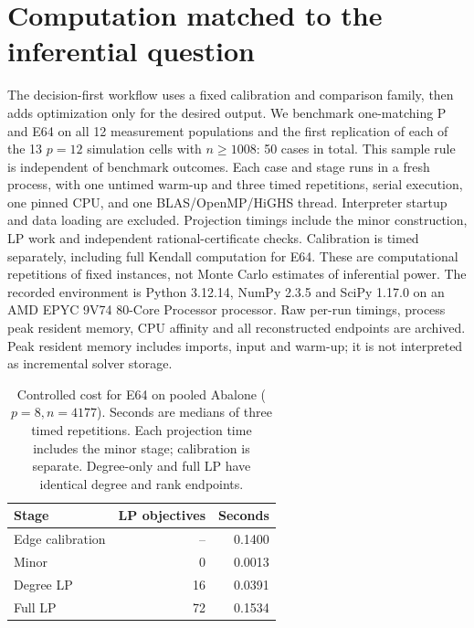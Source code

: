 \section{Computation matched to the inferential question}\label{sec:cost}
The decision-first workflow uses a fixed calibration and comparison family, then adds optimization only for the desired output. We benchmark one-matching P and E64 on all 12 measurement populations and the first replication of each of the 13 $p=12$ simulation cells with $n\ge1008$: 50 cases in total. This sample rule is independent of benchmark outcomes. Each case and stage runs in a fresh process, with one untimed warm-up and three timed repetitions, serial execution, one pinned CPU, and one BLAS/OpenMP/HiGHS thread. Interpreter startup and data loading are excluded. Projection timings include the minor construction, LP work and independent rational-certificate checks. Calibration is timed separately, including full Kendall computation for E64. These are computational repetitions of fixed instances, not Monte Carlo estimates of inferential power.
The recorded environment is Python 3.12.14, NumPy 2.3.5 and SciPy 1.17.0 on an AMD EPYC 9V74 80-Core Processor processor. Raw per-run timings, process peak resident memory, CPU affinity and all reconstructed endpoints are archived. Peak resident memory includes imports, input and warm-up; it is not interpreted as incremental solver storage.


\begin{table}[H]\centering\small
\setlength{\tabcolsep}{4pt}
\caption{Controlled cost for E64 on pooled Abalone ($p=8,n=4177$). Seconds are medians of three timed repetitions. Each projection time includes the minor stage; calibration is separate. Degree-only and full LP have identical degree and rank endpoints.}\label{tab:cost-abalone}
\begin{lrbox}{\resultsbox}\begin{tabular}{lrr}
\toprule
Stage & LP objectives & Seconds\\
\midrule
Edge calibration & -- & 0.1400\\
Minor & 0 & 0.0013\\
Degree LP & 16 & 0.0391\\
Full LP & 72 & 0.1534\\
\bottomrule\end{tabular}\end{lrbox}\ifdim\wd\resultsbox>\linewidth\resizebox{\linewidth}{!}{\usebox{\resultsbox}}\else\usebox{\resultsbox}\fi\end{table}


